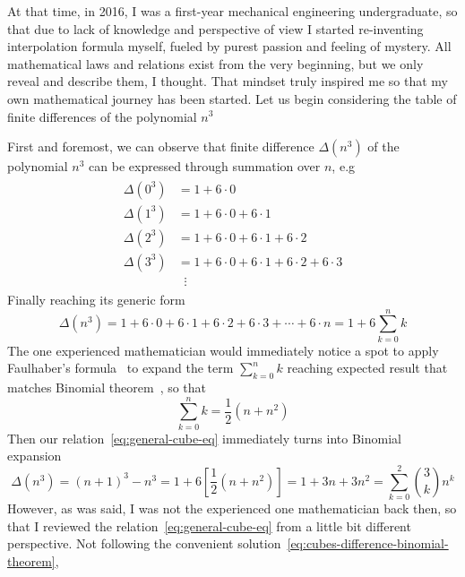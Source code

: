 At that time, in 2016, I was a first-year mechanical engineering undergraduate,
so that due to lack of knowledge and perspective of view I started re-inventing interpolation
formula myself, fueled by purest passion and feeling of mystery.
All mathematical laws and relations exist from the very beginning, but we only reveal and describe them, I thought.
That mindset truly inspired me so that my own mathematical journey has been started.
Let us begin considering the table of finite differences of the polynomial $n^3$

First and foremost, we can observe that finite difference $\Delta(n^3)$ of the polynomial $n^3$
can be expressed through summation over $n$, e.g
\begin{align}
    \label{eq:cubes_interpolation}
    \begin{split}
        \Delta(0^3) &= 1+6 \cdot 0 \\
        \Delta(1^3) &= 1+6\cdot0+6\cdot1 \\
        \Delta(2^3) &= 1+6\cdot0+6\cdot1+6\cdot2 \\
        \Delta(3^3) &= 1+6\cdot0+6\cdot1+6\cdot2+6\cdot3 \\
        &\; \; \vdots
    \end{split}
\end{align}
Finally reaching its generic form
\begin{equation}
    \Delta(n^3) = 1+6\cdot0+6\cdot1+6\cdot2+6\cdot3+\cdots+6\cdot n = 1 + 6 \sum_{k=0}^{n} k\label{eq:general-cube-eq}
\end{equation}
The one experienced mathematician would immediately notice a spot to apply Faulhaber's formula~\cite{beardon1996sums}
to expand the term $\sum_{k=0}^{n} k$ reaching expected result that matches Binomial theorem~\cite{abramowitz1988handbook},
so that
\begin{equation*}
    \sum_{k=0}^{n} k = \frac{1}{2}(n+n^2)
\end{equation*}
Then our relation~\eqref{eq:general-cube-eq} immediately turns into Binomial expansion
\begin{equation}
    \Delta(n^3) = (n+1)^3 - n^3 = 1 + 6 \left[ \frac{1}{2}(n+n^2) \right] = 1 + 3 n + 3 n^2 = \sum_{k=0}^{2} \binom{3}{k} n^k
    \label{eq:cubes-difference-binomial-theorem}
\end{equation}
However, as was said, I was not the experienced one mathematician back then,
so that I reviewed the relation~\eqref{eq:general-cube-eq} from a little bit different perspective.
Not following the convenient solution~\eqref{eq:cubes-difference-binomial-theorem},
